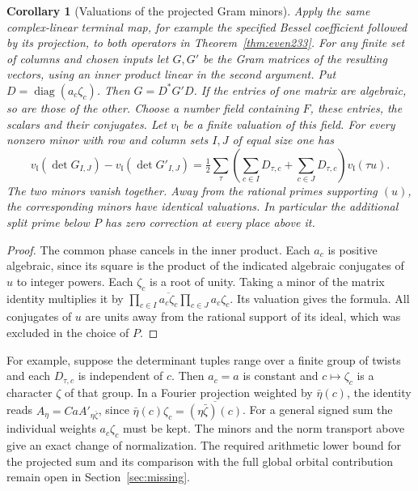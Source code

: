 \documentclass[a4paper,11pt]{article}
\newtheorem{corollary}[proposition]{Corollary}
\theoremstyle{definition}
\theoremstyle{remark}
\numberwithin{equation}{section}
\begin{document}
\begin{corollary}[Valuations of the projected Gram minors]
\label{cor:gram233}
Apply the same complex-linear terminal map, for example the specified
Bessel coefficient followed by its projection, to both operators
in Theorem~\ref{thm:even233}. For any finite set of columns and
chosen inputs let \(G,G'\) be the Gram matrices of the resulting
vectors, using an inner product linear in the second argument.
Put \(D=\operatorname{diag}(a_c\zeta_c)\). Then \(G=D^*G'D\).
If the entries of one matrix are algebraic, so are those of the
other. Choose a number field containing \(F\), these entries, the
scalars and their conjugates. Let \(v_{\mathfrak l}\) be a finite
valuation of this field.
For every nonzero minor with row and column sets \(I,J\) of equal
size one has
\[
 v_{\mathfrak l}(\det G_{I,J})-v_{\mathfrak l}(\det G'_{I,J})
   =\tfrac12\sum_\tau\left(\sum_{c\in I}D_{\tau,c}+
             \sum_{c\in J}D_{\tau,c}\right)v_{\mathfrak l}(\tau u).
\]
The two minors vanish together. Away from the rational primes
supporting \((u)\), the corresponding minors have identical
valuations. In particular the additional split prime below \(P\)
has zero correction at every place above it.
\end{corollary}
\begin{proof}
The common phase cancels in the inner product. Each \(a_c\) is
positive algebraic, since its square is the product of the indicated
algebraic conjugates of \(u\) to integer powers. Each \(\zeta_c\) is
a root of unity. Taking a minor of the matrix identity multiplies
it by \(\prod_{c\in I}\overline{a_c\zeta_c}\prod_{c\in J}a_c\zeta_c\).
Its valuation gives the formula. All conjugates of \(u\) are units
away from the rational support of its ideal, which was excluded in
the choice of \(P\).
\end{proof}

For example, suppose the determinant tuples range over a finite
group of twists and each \(D_{\tau,c}\) is independent of \(c\).
Then \(a_c=a\) is constant and \(c\mapsto\zeta_c\) is a character
\(\zeta\) of that group. In a Fourier projection weighted by
\(\bar\eta(c)\), the identity reads \(A_\eta=C a A'_{\eta\bar\zeta}\),
since \(\bar\eta(c)\zeta_c=\overline{(\eta\bar\zeta)(c)}\).
For a general signed sum the individual weights \(a_c\zeta_c\)
must be kept. The minors and the norm transport above give an
exact change of normalization. The required arithmetic lower bound
for the projected sum and its comparison with the full global
orbital contribution remain open in Section~\ref{sec:missing}.
\end{document}
